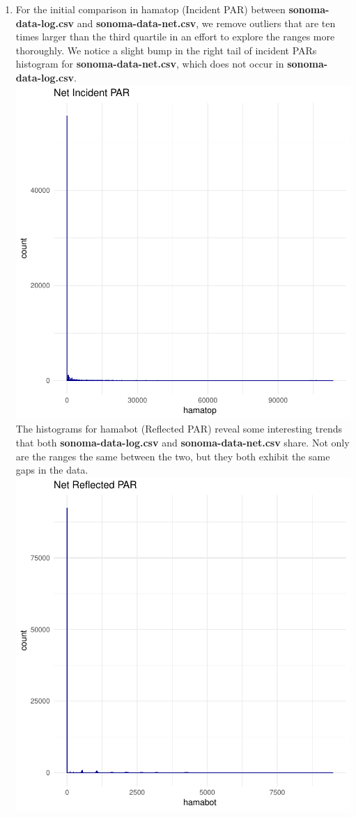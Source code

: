 \documentclass[11pt]{article}
\begin{document}
\begin{enumerate}[label=(\alph*)]
\item
For the initial comparison in hamatop (Incident PAR) between \textbf{sonoma-data-log.csv} and \textbf{sonoma-data-net.csv}, we remove outliers that are ten times larger than the third quartile in an effort to explore the ranges more thoroughly. We notice a slight bump in the right tail of incident PARs histogram for \textbf{sonoma-data-net.csv}, which does not occur in \textbf{sonoma-data-log.csv}.
\includegraphics{project1writeup-002}
The histograms for hamabot (Reflected PAR) reveal some interesting trends that both \textbf{sonoma-data-log.csv} and \textbf{sonoma-data-net.csv} share. Not only are the ranges the same between the two, but they both exhibit the same gaps in the data.
\includegraphics{project1writeup-003}

\end{enumerate}
\end{document}
